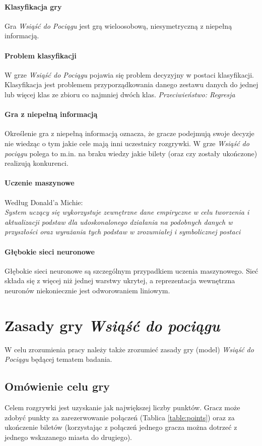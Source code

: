 \documentclass[12pt, oneside]{report}
\begin{document}
\paragraph{Klasyfikacja gry}
Gra \textit{Wsiąść do Pociągu} jest grą wieloosobową, niesymetryczną z niepełną informacją. 
\paragraph{Problem klasyfikacji}
W grze \textit{Wsiąść do Pociągu} pojawia się problem decyzyjny w postaci klasyfikacji. Klasyfikacja jest problemem przyporządkowania danego zestawu danych do jednej lub więcej klas ze zbioru co najmniej dwóch klas. \textit{Przeciwieństwo: Regresja}
\paragraph{Gra z niepełną informacją} 
Określenie gra z niepełną informacją oznacza, że gracze podejmują swoje decyzje nie wiedząc o tym jakie cele mają inni uczestnicy rozgrywki. W grze \textit{Wsiąść do pociągu} polega to m.in. na braku wiedzy jakie bilety (oraz czy zostały ukończone) realizują konkurenci.
\paragraph{Uczenie maszynowe}
Według Donald'a Michie: \\ \textit{System uczący się wykorzystuje zewnętrzne dane empiryczne w celu tworzenia i aktualizacji podstaw dla udoskonalonego działania na podobnych danych w przyszłości oraz wyrażania tych podstaw w zrozumiałej i symbolicznej postaci}
\paragraph{Głębokie sieci neuronowe}
Głębokie sieci neuronowe są szczególnym przypadkiem uczenia maszynowego. Sieć składa się z więcej niż jednej warstwy ukrytej, a reprezentacja wewnętrzna neuronów niekoniecznie jest odworowaniem liniowym.
\section{Zasady gry \textit{Wsiąść do pociągu}}
W celu zrozumienia pracy należy także zrozumieć zasady gry (model) \textit{Wsiąść do Pociągu} będącej tematem badania.
\subsection{Omówienie celu gry}
Celem rozgrywki jest uzyskanie jak największej liczby punktów. Gracz może zdobyć punkty za zarezerwowanie połączeń (Tablica  \ref{table:points}) oraz za ukończenie biletów (korzystając z połączeń jednego gracza można dotrzeć z jednego wskazanego miasta do drugiego). 
\end{document}
